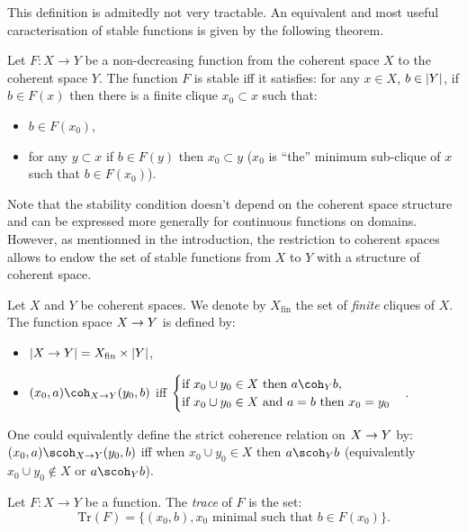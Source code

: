 This definition is admitedly not very tractable. An equivalent and most
useful caracterisation of stable functions is given by the following
theorem.

\begin{theorem}
Let $F:X\longrightarrow Y$ be a non-decreasing function from the coherent space $X$ to the coherent space $Y$. The function $F$ is stable iff it satisfies: for any $x\in X$, $b\in\left|Y\right|$, if $b\in F(x)$ then there is a finite clique $x_0\subset x$ such that:
\begin{itemize}
\item $b\in F(x_0)$,
\item for any $y\subset x$ if $b\in F(y)$ then $x_0\subset y$ ($x_0$ is ``the'' minimum sub-clique of $x$ such that $b\in F(x_0)$). 
\end{itemize}
\end{theorem}

Note that the stability condition doesn't depend on the coherent space
structure and can be expressed more generally for continuous functions
on domains. However, as mentionned in the introduction, the restriction
to coherent spaces allows to endow the set of stable functions from
\(X\) to \(Y\) with a structure of coherent space.

\begin{definition}
Let $X$ and $Y$ be coherent spaces. We denote by $X_{\mathrm{fin}}$ the set of \emph{finite} cliques of $X$. The function space $X\rightarrow Y$ is defined by:
\begin{itemize}
\item $\left|X\rightarrow Y\right| = X_{\mathrm{fin}}\times \left|Y\right|$,
\item $(x_0, a)\coh_{X\imp Y}(y_0, b)$ iff $\begin{cases}\text{if } x_0\cup y_0\in X\text{ then } a\coh_Y b,\\
\text{if } x_0\cup y_0\in X\text{ and } a = b\text{ then } x_0 = y_0\end{cases}$.
\end{itemize}
\end{definition}

One could equivalently define the strict coherence relation on
\(X\rightarrow Y\) by: \((x_0,a)\scoh_{X\imp Y}(y_0, b)\) iff when
\(x_0\cup y_0\in X\) then \(a\scoh_Y b\) (equivalently
\(x_0\cup y_0\not\in X\) or \(a\scoh_Y b\)).

\begin{definition}
Let $F:X\longrightarrow Y$ be a function. The \emph{trace} of $F$ is the set:
\begin{equation*}
\mathrm{Tr}(F) = \{(x_0, b), x_0\text{ minimal such that } b\in F(x_0)\}.
\end{equation*}
\end{definition}

